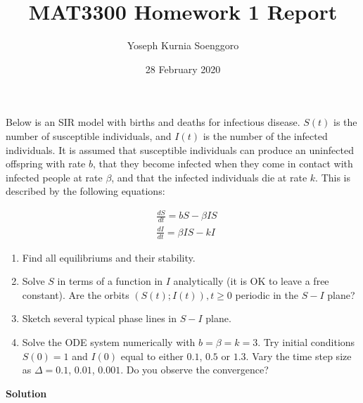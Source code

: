 \documentclass{article}
\title{MAT3300 Homework 1 Report}
\author{Yoseph Kurnia Soenggoro}
\date{28 February 2020}
\begin{document}
\maketitle

\begin{flushleft}
    Below is an SIR model with births and deaths for infectious disease. $S(t)$ is the number of susceptible individuals, and $I(t)$ is the number of the infected individuals. It is assumed that susceptible individuals can produce an uninfected offspring with rate $b$, that they become infected when they come in contact with infected people at rate $\beta$, and that the infected individuals die at rate $k$. This is described by the following equations:
    
    \begin{align*}
        & \frac{dS}{dt} = bS - \beta IS \\
        & \frac{dI}{dt} = \beta IS - kI
    \end{align*}
    
\end{flushleft}

\begin{enumerate}
    \item Find all equilibriums and their stability.

    \item Solve $S$ in terms of a function in $I$ analytically (it is OK to leave a free constant). Are the orbits $(S(t); I(t)), t \geq 0$ periodic in the $S-I$ plane?
    
    \item Sketch several typical phase lines in $S-I$ plane.
    
    \item Solve the ODE system numerically with $b = \beta = k = 3$. Try initial conditions $S(0) = 1$ and $I(0)$ equal to either $0.1$, $0.5$ or $1.3$. Vary the time step size as $\Delta = 0.1$, $0.01$, $0.001$. Do you observe the convergence?
    
\end{enumerate}

\begin{flushleft}
    \textbf{Solution}
\end{flushleft}


\begin{flushleft}
    
\end{flushleft}

\begin{flushleft}
    
\end{flushleft}
\end{document}
